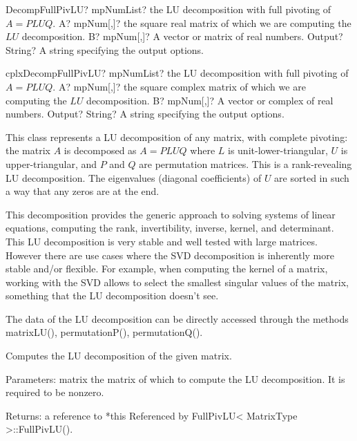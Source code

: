 \begin{mpFunctionsExtract}
	\mpFunctionThree
	{DecompFullPivLU? mpNumList? the LU decomposition with full pivoting of $A = PLUQ$.}
	{A? mpNum[,]? the square real matrix of which we are computing the $LU$ decomposition.}
	{B? mpNum[,]? A vector or matrix of real numbers.}
	{Output? String? A string specifying the output options.}
\end{mpFunctionsExtract}

\vspace{0.6cm}
\begin{mpFunctionsExtract}
	\mpFunctionThree
	{cplxDecompFullPivLU? mpNumList? the LU decomposition with full pivoting of $A = PLUQ$.}
	{A? mpNum[,]? the square complex matrix of which we are computing the $LU$ decomposition.}
	{B? mpNum[,]? A vector or complex of real numbers.}
	{Output? String? A string specifying the output options.}
\end{mpFunctionsExtract}


\vspace{0.3cm}

This class represents a LU decomposition of any matrix, with complete pivoting: the matrix $A$ is decomposed as $A = PLUQ$ where $L$ is unit-lower-triangular, $U$ is upper-triangular, and $P$ and $Q$ are permutation matrices. This is a rank-revealing LU decomposition. The eigenvalues (diagonal coefficients) of $U$ are sorted in such a way that any zeros are at the end.

This decomposition provides the generic approach to solving systems of linear equations, computing the rank, invertibility, inverse, kernel, and determinant.
This LU decomposition is very stable and well tested with large matrices. However there are use cases where the SVD decomposition is inherently more stable and/or flexible. For example, when computing the kernel of a matrix, working with the SVD allows to select the smallest singular values of the matrix, something that the LU decomposition doesn't see.

The data of the LU decomposition can be directly accessed through the methods matrixLU(), permutationP(), permutationQ().


Computes the LU decomposition of the given matrix.

Parameters: matrix the matrix of which to compute the LU decomposition. It is required to be nonzero. 

Returns: a reference to *this 
Referenced by FullPivLU< MatrixType >::FullPivLU().


